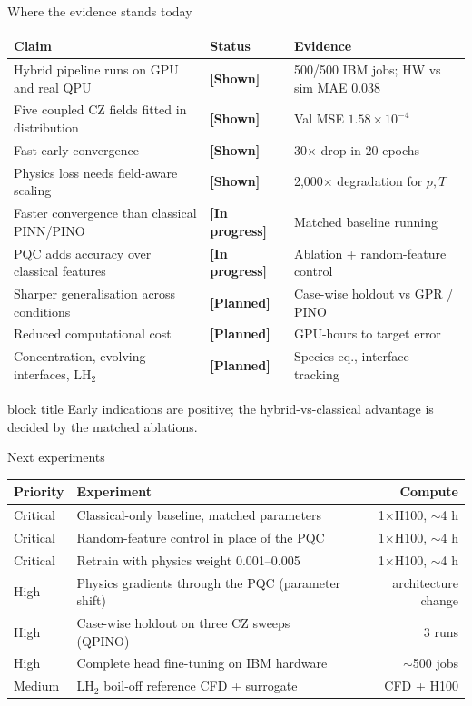 \documentclass[aspectratio=169,10pt]{beamer}
\newcommand{\shown}{\textcolor{okgreen}{\textbf{[Shown]}}}
\newcommand{\pending}{\textcolor{warnorange}{\textbf{[In progress]}}}
\newcommand{\planned}{\textcolor{phgray}{\textbf{[Planned]}}}
\newcommand{\takeaway}[1]{%
  \vfill
  \begin{beamercolorbox}[rounded=true,shadow=false,wd=\linewidth,sep=4pt]{block title}
  \small\centering #1
  \end{beamercolorbox}}
\begin{document}
\begin{frame}{Where the evidence stands today}
\renewcommand{\arraystretch}{1.08}
\footnotesize
\begin{tabular}{p{} p{} p{}}
\toprule
Claim & Status & Evidence \\
\midrule
Hybrid pipeline runs on GPU and real QPU & \shown & 500/500 IBM jobs; HW vs sim MAE 0.038 \\
Five coupled CZ fields fitted in distribution & \shown & Val MSE $1.58\times10^{-4}$ \\
Fast early convergence & \shown & 30$\times$ drop in 20 epochs \\
Physics loss needs field-aware scaling & \shown & 2,000$\times$ degradation for $p,T$ \\
Faster convergence than classical PINN/PINO & \pending & Matched baseline running \\
PQC adds accuracy over classical features & \pending & Ablation + random-feature control \\
Sharper generalisation across conditions & \planned & Case-wise holdout vs GPR / PINO \\
Reduced computational cost & \planned & GPU-hours to target error \\
Concentration, evolving interfaces, LH$_2$ & \planned & Species eq., interface tracking \\
\bottomrule
\end{tabular}
\takeaway{Early indications are positive; the hybrid-vs-classical advantage is decided by the matched ablations.}
\end{frame}

\begin{frame}{Next experiments}
\renewcommand{\arraystretch}{1.1}
\small
\centering
\begin{tabular}{llr}
\toprule
Priority & Experiment & Compute \\
\midrule
Critical & Classical-only baseline, matched parameters & 1$\times$H100, $\sim$4 h \\
Critical & Random-feature control in place of the PQC & 1$\times$H100, $\sim$4 h \\
Critical & Retrain with physics weight 0.001--0.005 & 1$\times$H100, $\sim$4 h \\
High & Physics gradients through the PQC (parameter shift) & architecture change \\
High & Case-wise holdout on three CZ sweeps (QPINO) & 3 runs \\
High & Complete head fine-tuning on IBM hardware & $\sim$500 jobs \\
Medium & LH$_2$ boil-off reference CFD + surrogate & CFD + H100 \\
\bottomrule
\end{tabular}
\end{frame}
\end{document}

